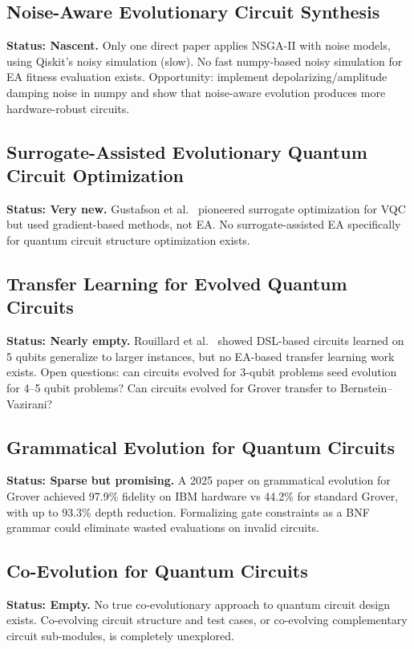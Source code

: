 \documentclass[11pt]{article}
\begin{document}
\subsection{Noise-Aware Evolutionary Circuit Synthesis}
\textbf{Status: Nascent.}
Only one direct paper \cite{noiseaware2026} applies NSGA-II with noise models, using Qiskit's noisy simulation (slow). No fast numpy-based noisy simulation for EA fitness evaluation exists. Opportunity: implement depolarizing/amplitude damping noise in numpy and show that noise-aware evolution produces more hardware-robust circuits.

\subsection{Surrogate-Assisted Evolutionary Quantum Circuit Optimization}
\textbf{Status: Very new.}
Gustafson et al.\ \cite{gustafson2025} pioneered surrogate optimization for VQC but used gradient-based methods, not EA. No surrogate-assisted EA specifically for quantum circuit structure optimization exists.

\subsection{Transfer Learning for Evolved Quantum Circuits}
\textbf{Status: Nearly empty.}
Rouillard et al.\ \cite{rouillard2025} showed DSL-based circuits learned on 5 qubits generalize to larger instances, but no EA-based transfer learning work exists. Open questions: can circuits evolved for 3-qubit problems seed evolution for 4--5 qubit problems? Can circuits evolved for Grover transfer to Bernstein--Vazirani?

\subsection{Grammatical Evolution for Quantum Circuits}
\textbf{Status: Sparse but promising.}
A 2025 paper on grammatical evolution for Grover achieved 97.9\% fidelity on IBM hardware vs 44.2\% for standard Grover, with up to 93.3\% depth reduction. Formalizing gate constraints as a BNF grammar could eliminate wasted evaluations on invalid circuits.

\subsection{Co-Evolution for Quantum Circuits}
\textbf{Status: Empty.}
No true co-evolutionary approach to quantum circuit design exists. Co-evolving circuit structure and test cases, or co-evolving complementary circuit sub-modules, is completely unexplored.
\end{document}
